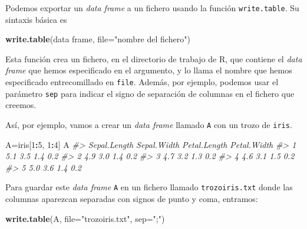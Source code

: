 \documentclass[
]{book}
\newenvironment{Shaded}{\begin{snugshade}}{\end{snugshade}}
\newcommand{\CommentTok}[1]{\textcolor[rgb]{0.56,0.35,0.01}{\textit{#1}}}
\newcommand{\DataTypeTok}[1]{\textcolor[rgb]{0.13,0.29,0.53}{#1}}
\newcommand{\DecValTok}[1]{\textcolor[rgb]{0.00,0.00,0.81}{#1}}
\newcommand{\KeywordTok}[1]{\textcolor[rgb]{0.13,0.29,0.53}{\textbf{#1}}}
\newcommand{\NormalTok}[1]{#1}
\newcommand{\OperatorTok}[1]{\textcolor[rgb]{0.81,0.36,0.00}{\textbf{#1}}}
\newcommand{\StringTok}[1]{\textcolor[rgb]{0.31,0.60,0.02}{#1}}
\theoremstyle{definition}
\theoremstyle{definition}
\theoremstyle{definition}
\theoremstyle{remark}
\begin{document}
Podemos exportar un \emph{data frame} a un fichero usando la función \texttt{write.table}. Su sintaxis básica es

\begin{Shaded}
\begin{Highlighting}[]
\KeywordTok{write.table}\NormalTok{(data frame, }\DataTypeTok{file=}\StringTok{"nombre del fichero"}\NormalTok{)}
\end{Highlighting}
\end{Shaded}

Esta función crea un fichero, en el directorio de trabajo de R, que contiene el \emph{data frame} que hemos especificado en el argumento, y lo llama el nombre que hemos especificado entrecomillado en \texttt{file}. Además, por ejemplo, podemos usar el parámetro \texttt{sep} para indicar el signo de separación de columnas en el fichero que creemos.

Así, por ejemplo, vamos a crear un \emph{data frame} llamado \texttt{A} con un trozo de \texttt{iris}.

\begin{Shaded}
\begin{Highlighting}[]
\NormalTok{A=iris[}\DecValTok{1}\OperatorTok{:}\DecValTok{5}\NormalTok{, }\DecValTok{1}\OperatorTok{:}\DecValTok{4}\NormalTok{]}
\NormalTok{A}
\CommentTok{\#\textgreater{}   Sepal.Length Sepal.Width Petal.Length Petal.Width}
\CommentTok{\#\textgreater{} 1          5.1         3.5          1.4         0.2}
\CommentTok{\#\textgreater{} 2          4.9         3.0          1.4         0.2}
\CommentTok{\#\textgreater{} 3          4.7         3.2          1.3         0.2}
\CommentTok{\#\textgreater{} 4          4.6         3.1          1.5         0.2}
\CommentTok{\#\textgreater{} 5          5.0         3.6          1.4         0.2}
\end{Highlighting}
\end{Shaded}

Para guardar este \emph{data frame} \texttt{A} en un fichero llamado \texttt{trozoiris.txt} donde las columnas aparezcan separadas con signos de punto y coma, entramos:

\begin{Shaded}
\begin{Highlighting}[]
\KeywordTok{write.table}\NormalTok{(A, }\DataTypeTok{file=}\StringTok{"trozoiris.txt"}\NormalTok{, }\DataTypeTok{sep=}\StringTok{";"}\NormalTok{)}
\end{Highlighting}
\end{Shaded}
\end{document}
